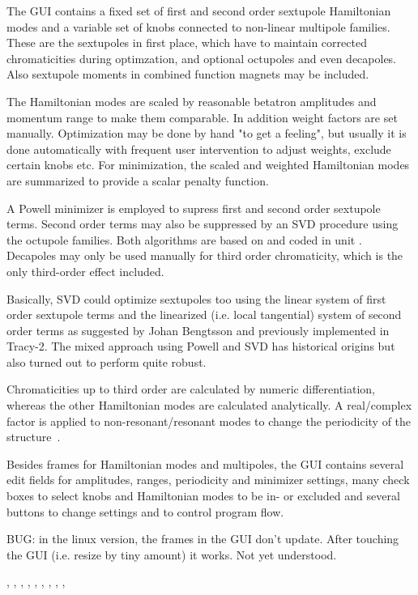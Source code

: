 \documentclass[12pt]{article}
\newcommand\code[1]{{\tt #1}}
\newcommand{\opagui}[1]{\colorbox{blue!20}{{\color{black}\code{#1}}}}
\newcommand{\ogui}[1]{\hyperref[#1]{\opagui{#1}}}
\newcommand{\opaguif}[1]{\colorbox{violet!30}{{\color{black}\code{#1}}}}
\newcommand{\oguif}[1]{\hyperref[#1]{\opaguif{#1}}}
\newcommand{\opauni}[1]{\colorbox{orange!30}{{\color{black}\code{#1}}}}
\newcommand{\ouni}[1]{\hyperref[#1]{\opauni{#1}}}
\newcommand{\uses}[1]{\flushleft {\bf Uses:} #1}
\newcommand{\desc}[1]{#1}
\newcommand{\todo}[1]{{\color{red} #1}}
\begin{document}
\desc{
The GUI contains a fixed set of first and second order sextupole Hamiltonian modes and a variable set of knobs connected to non-linear multipole families. These are the sextupoles in first place, which have to maintain corrected chromaticities during optimzation, and optional octupoles and even decapoles. Also sextupole moments in combined function magnets may be included. 

The Hamiltonian modes are scaled by reasonable  betatron amplitudes and momentum range to make them comparable. In addition weight factors are set manually. Optimization may be done by hand "to get a feeling", but usually it is done automatically with frequent user intervention to adjust weights, exclude certain knobs etc. For minimization, the scaled and weighted Hamiltonian modes are summarized to provide a scalar penalty function.

A Powell minimizer is employed to supress first and second order sextupole terms. Second order terms may also be suppressed by an SVD procedure using the octupole families. Both algorithms are based on \cite{numrec} and coded in unit \ouni{mathlib}. Decapoles may only be used manually for third order chromaticity, which is the only third-order effect included.

\todo{Basically, SVD could optimize sextupoles too using the linear system of first order sextupole terms and the linearized (i.e. local tangential) system of second order terms as suggested by Johan Bengtsson and previously implemented in Tracy-2. The mixed approach using Powell and SVD has historical origins but also turned out to perform quite robust.}

Chromaticities up to third order are calculated by numeric differentiation, whereas the other Hamiltonian modes are calculated analytically. A real/complex factor is applied to non-resonant/resonant modes to change the periodicity of the structure~\cite{inside}. 

Besides frames for Hamiltonian modes and multipoles, the GUI contains several edit fields for amplitudes, ranges, periodicity and minimizer settings, many check boxes to select knobs and Hamiltonian modes to be in- or excluded and several buttons to change settings and to control program flow.


\todo{BUG: in the linux version, the frames in the GUI don't update. After touching the GUI (i.e. resize by tiny amount) it works. Not yet understood.}
}


\uses{
\oguif{chamframe}, \oguif{csexframe}, \ouni{chromreslib}, \ouni{chromelelib},  \ouni{chromlib}, \ogui{ochromsvector}, \ogui{opatunediag}, \ouni{globlib}, \ouni{mathlib}, \ouni{../com/asaux}
}
\end{document}
